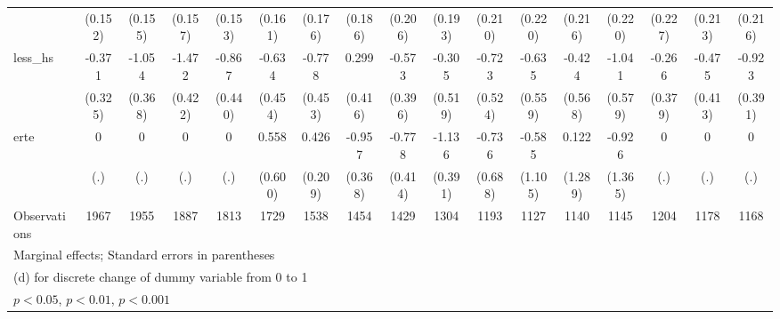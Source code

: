 {\begin{tabular}{l*{16}{c}}
                    &     (0.152)         &     (0.155)         &     (0.157)         &     (0.153)         &     (0.161)         &     (0.176)         &     (0.186)         &     (0.206)         &     (0.193)         &     (0.210)         &     (0.220)         &     (0.216)         &     (0.220)         &     (0.227)         &     (0.213)         &     (0.216)         \\
[1em]
less\_hs             &      -0.371         &      -1.054\sym{**} &      -1.472\sym{***}&      -0.867\sym{*}  &      -0.634         &      -0.778         &       0.299         &      -0.573         &      -0.305         &      -0.723         &      -0.635         &      -0.424         &      -1.041         &      -0.266         &      -0.475         &      -0.923\sym{*}  \\
                    &     (0.325)         &     (0.368)         &     (0.422)         &     (0.440)         &     (0.454)         &     (0.453)         &     (0.416)         &     (0.396)         &     (0.519)         &     (0.524)         &     (0.559)         &     (0.568)         &     (0.579)         &     (0.379)         &     (0.413)         &     (0.391)         \\
[1em]
erte                &           0         &           0         &           0         &           0         &       0.558         &       0.426\sym{*}  &      -0.957\sym{**} &      -0.778         &      -1.136\sym{**} &      -0.736         &      -0.585         &       0.122         &      -0.926         &           0         &           0         &           0         \\
                    &         (.)         &         (.)         &         (.)         &         (.)         &     (0.600)         &     (0.209)         &     (0.368)         &     (0.414)         &     (0.391)         &     (0.688)         &     (1.105)         &     (1.289)         &     (1.365)         &         (.)         &         (.)         &         (.)         \\
\hline
Observations        &        1967         &        1955         &        1887         &        1813         &        1729         &        1538         &        1454         &        1429         &        1304         &        1193         &        1127         &        1140         &        1145         &        1204         &        1178         &        1168         \\
\hline\hline
\multicolumn{17}{l}{\footnotesize Marginal effects; Standard errors in parentheses}\\
\multicolumn{17}{l}{\footnotesize  (d) for discrete change of dummy variable from 0 to 1}\\
\multicolumn{17}{l}{\footnotesize \sym{*} \(p<0.05\), \sym{**} \(p<0.01\), \sym{***} \(p<0.001\)}\\
\end{tabular}
}
